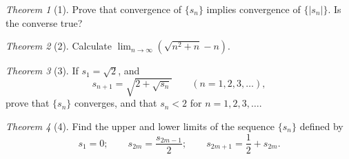 \documentclass[12pt]{article}
\theoremstyle{remark}
\theoremstyle{named}
\newtheorem*{theorem}{Theorem}
\begin{document}
\begin{theorem}[1]
    Prove that convergence of \(\{s_n\}\) implies convergence of \(\{|s_n|\}\). Is the converse true?
\end{theorem}

\begin{theorem}[2]
    Calculate \(\lim_{n \to \infty} (\sqrt{n^2 + n} - n)\).
\end{theorem}

\begin{theorem}[3]
    If \(s_1 = \sqrt 2\), and 
    \[s_{n + 1} = \sqrt{2 + \sqrt{s_n}} \hspace{2em} (n = 1, 2, 3, \dots),\]
    prove that \(\{s_n\}\) converges, and that \(s_n < 2\) for \(n = 1, 2, 3, \dots\).
\end{theorem}

\begin{theorem}[4]
    Find the upper and lower limits of the sequence \(\{s_n\}\) defined by
    \[s_1 = 0; \hspace{2em} s_{2m} = \frac{s_{2m - 1}}{2}; \hspace{2em} s_{2m + 1} = \frac{1}{2} + s_{2m}.\]
\end{theorem}
\end{document}
